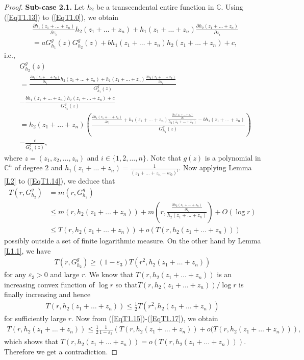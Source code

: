 \documentclass[11pt,reqno]{amsart}
\numberwithin{equation}{section}
\begin{document}
\begin{proof}
\medskip
{\bf Sub-case 2.1.} Let $h_2$ be a transcendental entire function in $\mathbb{C}$. Using (\ref{EqT1.13}) to (\ref{EqT1.0}), we obtain
\begin{align}\label{EqT1.13a}
&\frac{\partial h_1(z_1+\ldots+z_n)}{\partial z_i}h_2(z_1+\ldots+z_n)+h_1(z_1+\ldots+z_n) \frac{\partial h_2(z_1+\ldots+z_n)}{\partial z_i}\\&=aG^g_{h_1}(z)G^g_{h_2}(z)+bh_1(z_1+\ldots+z_n)h_2(z_1+\ldots+z_n)+c,\nonumber
\end{align}
i.e.,
\begin{align}\label{EqT1.14}
&G^g_{h_2}(z)\\&=\frac{\frac{\partial h_1(z_1+\ldots+z_n)}{\partial z_i}h_2(z_1+\ldots+z_n)+h_1(z_1+\ldots+z_n) \frac{\partial h_2(z_1+\ldots+z_n)}{\partial z_i}}{G^g_{h_1}(z)}\nonumber\\&-\frac{bh_1(z_1+\ldots+z_n)h_2(z_1+\ldots+z_n)+c}{G^g_{h_1}(z)}\nonumber\\&=
h_2(z_1+\ldots+z_n)\left(\frac{\frac{\partial h_1(z_1+\ldots+z_n)}{\partial z_i}+h_1(z_1+\ldots+z_n) \frac{\frac{\partial h_2(z_1+\ldots+z_n)}{\partial z_i}}{h_2(z_1+\ldots+z_n)}-bh_1(z_1+\ldots+z_n)}{G^g_{h_1}(z)}\right)\nonumber\\&-\frac{c}{G^g_{h_1}(z)},\nonumber
\end{align}
where $z=(z_1,z_2,\ldots,z_n)$ and $i\in\{1,2,\ldots,n\}$. Note that $g(z)$ is a polynomial in $\mathbb{C}^n$ of degree $2$ and $h_1(z_1+\ldots+z_n)=\frac{1}{(z_1+\ldots+z_n-w_0)^l}$. Now applying Lemma \ref{L2} to (\ref{EqT1.14}), we deduce that
\begin{align}\label{EqT1.15}
T\left(r,G^g_{h_2}\right)&=m\left(r,G^g_{h_2}\right)\\&\leq m\left(r,h_2(z_1+\ldots+z_n)\right)+m\left(r,\frac{\frac{\partial h_2(z_1+\ldots+z_n)}{\partial z_i}}{h_2(z_1+\ldots+z_n)}\right)+O(\log r)\nonumber\\&
\leq T(r,h_2(z_1+\ldots+z_n))+o(T(r,h_2(z_1+\ldots+z_n)))
\end{align}
possibly outside a set of finite logarithmic measure. On the other hand by Lemma \ref{L1.1}, we have
\begin{align}\label{EqT1.16}
T\left(r,G^g_{h_2}\right)\geq (1-\varepsilon_3)T\left(r^2,h_2(z_1+\ldots+z_n)\right)
\end{align}
for any $\varepsilon_3>0$ and large $r$. We know that $T(r,h_2(z_1+\ldots+z_n))$ is an increasing convex function of $\log r$ so that$T(r,h_2(z_1+\ldots+z_n))/\log r$ is finally increasing and hence
\begin{align}\label{EqT1.17}
T(r,h_2(z_1+\ldots+z_n))\leq \frac{1}{2} T\left(r^2,h_2(z_1+\ldots+z_n)\right)
\end{align}
for sufficiently large $r$. Now from (\ref{EqT1.15})-(\ref{EqT1.17}), we obtain
\begin{align*}
T(r,h_2(z_1+\ldots+z_n))\leq \frac{1}{2}\frac{1}{1-\varepsilon_3}\left(T(r,h_2(z_1+\ldots+z_n))+o(T(r,h_2(z_1+\ldots+z_n))\right),
\end{align*}
which shows that $T(r,h_2(z_1+\ldots+z_n))=o(T(r,h_2(z_1+\ldots+z_n)))$. Therefore we get a contradiction.



\end{proof}
\end{document}
